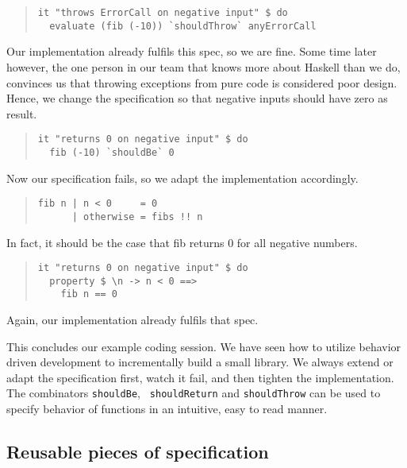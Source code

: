 \documentclass[preprint]{sigplanconf}
\begin{document}
\begin{quote}
\small
\begin{verbatim}
it "throws ErrorCall on negative input" $ do
  evaluate (fib (-10)) `shouldThrow` anyErrorCall
\end{verbatim}
\end{quote}

\noindent Our implementation already fulfils this spec, so we are
fine. Some time later however, the one person in our team that knows
more about Haskell than we do, convinces us that throwing exceptions
from pure code is considered poor design. Hence, we change the
specification so that negative inputs should have zero as result.

\begin{quote}
\small
\begin{verbatim}
it "returns 0 on negative input" $ do
  fib (-10) `shouldBe` 0
\end{verbatim}
\end{quote}

\noindent Now our specification fails, so we adapt the implementation
accordingly.

\begin{quote}
\small
\begin{verbatim}
fib n | n < 0     = 0
      | otherwise = fibs !! n
\end{verbatim}
\end{quote}

\noindent In fact, it should be the case that fib returns 0 for all
negative numbers.

\begin{quote}
\small
\begin{verbatim}
it "returns 0 on negative input" $ do
  property $ \n -> n < 0 ==>
    fib n == 0
\end{verbatim}
\end{quote}


\noindent Again, our implementation already fulfils that spec.

This concludes our example coding session.  We have seen how to utilize
behavior driven development to incrementally build a small library.
We always extend or adapt the specification first, watch it fail,  and
then tighten the implementation.  The combinators {\tt shouldBe}, {\tt
shouldReturn} and {\tt shouldThrow} can be used to specify behavior of
functions in an intuitive, easy to read manner.

\subsection{Reusable pieces of specification}
\label{sec:reusable-specs}
\end{document}
